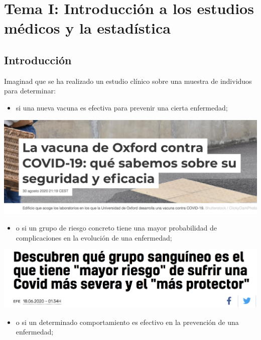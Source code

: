 \documentclass[
]{book}
\providecommand{\tightlist}{%
  \setlength{\itemsep}{0pt}\setlength{\parskip}{0pt}}
\theoremstyle{definition}
\theoremstyle{definition}
\theoremstyle{definition}
\theoremstyle{definition}
\theoremstyle{remark}
\begin{document}
\hypertarget{part-tema-i-introducciuxf3n-a-los-estudios-muxe9dicos-y-la-estaduxedstica}{%
\part*{Tema I: Introducción a los estudios médicos y la estadística}\label{part-tema-i-introducciuxf3n-a-los-estudios-muxe9dicos-y-la-estaduxedstica}}

\hypertarget{introducciuxf3n}{%
\chapter{Introducción}\label{introducciuxf3n}}

Imaginad que se ha realizado un estudio clínico sobre una muestra de individuos para determinar:

\begin{itemize}
\tightlist
\item
  si una nueva vacuna es efectiva para prevenir una cierta enfermedad;
\end{itemize}

\begin{center}\includegraphics[width=0.6\linewidth]{INREMDN_files/figure-html/covidintro1} \end{center}

\begin{itemize}
\tightlist
\item
  o si un grupo de riesgo concreto tiene una mayor probabilidad de complicaciones en la evolución de una enfermedad;
\end{itemize}

\begin{center}\includegraphics[width=0.6\linewidth]{INREMDN_files/figure-html/covidintro2} \end{center}

\begin{itemize}
\tightlist
\item
  o si un determinado comportamiento es efectivo en la prevención de una enfermedad;
\end{itemize}
\end{document}
